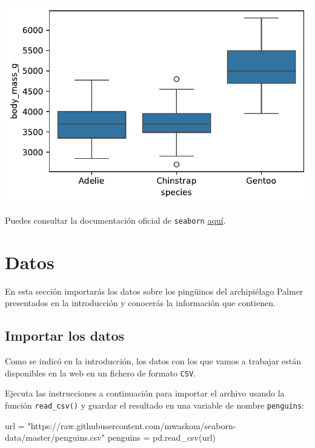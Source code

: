 \documentclass[
  a4paper,
  noprof,
  12pt,
  notoc,
  nosols,
  nobib]{mnye}
\newenvironment{Shaded}{\begin{snugshade}}{\end{snugshade}}
\newcommand{\NormalTok}[1]{\textcolor[rgb]{0.00,0.23,0.31}{#1}}
\newcommand{\OperatorTok}[1]{\textcolor[rgb]{0.37,0.37,0.37}{#1}}
\newcommand{\StringTok}[1]{\textcolor[rgb]{0.13,0.47,0.30}{#1}}
\theoremstyle{definition}
\theoremstyle{remark}
\begin{document}
\includegraphics{chapters/libraries_files/figure-pdf/cell-5-output-1.pdf}

Puedes consultar la documentación oficial de \texttt{seaborn}
\href{https://seaborn.pydata.org/index.html}{aquí}.


\section{Datos}\label{datos}

En esta sección importarás los datos sobre los pingüinos del
archipiélago Palmer presentados en la introducción y conocerás la
información que contienen.

\subsection{Importar los datos}\label{sec-read_csv}

Como se indicó en la introducción, los datos con los que vamos a
trabajar están disponibles en la web en un fichero de formato
\texttt{CSV}.

Ejecuta las instrucciones a continuación para importar el archivo usando
la función \texttt{read\_csv()} y guardar el resultado en una variable
de nombre \texttt{penguins}:

\begin{Shaded}
\begin{Highlighting}[]
\NormalTok{url }\OperatorTok{=} \StringTok{"https://raw.githubusercontent.com/mwaskom/seaborn{-}data/master/penguins.csv"}
\NormalTok{penguins }\OperatorTok{=}\NormalTok{ pd.read\_csv(url)}
\end{Highlighting}
\end{Shaded}
\end{document}
